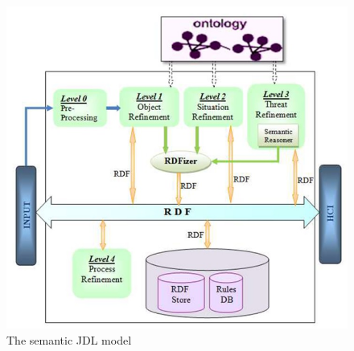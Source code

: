 \documentclass[5p,times]{elsarticle}
\begin{document}
\begin{figure}[t]
  \centering
  \includegraphics[width=\columnwidth]{Semantic_JDL.jpg}
  \caption{The semantic JDL model \cite{noughabi2013semfus}}
  \label{fig:semantidJDL}
\end{figure}
\end{document}
